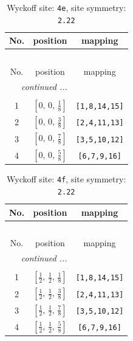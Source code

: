 \documentclass[fleqn,8pt]{jsarticle}
\begin{document}
\renewcommand{\arraystretch}{1.2}
\begin{longtable}{ccc}
\caption{Wyckoff site: {\tt 4e}, site symmetry: {\tt 2.22}}
 \\
 \hline \hline
No. & position & mapping \\ \hline \endfirsthead

\multicolumn{2}{l}{\tablename\ \thetable{}} \\
 \hline \hline
No. & position & mapping \\ \hline \endhead

 \hline \hline
\multicolumn{2}{r}{\footnotesize\it continued ...} \\ \endfoot

 \hline \hline
\multicolumn{2}{r}{} \\ \endlastfoot

1 & $\left[ 0,\, 0,\, \frac{1}{8} \right]$ & {\tt [1,8,14,15]} \\ \hline
2 & $\left[ 0,\, 0,\, \frac{3}{8} \right]$ & {\tt [2,4,11,13]} \\ \hline
3 & $\left[ 0,\, 0,\, \frac{7}{8} \right]$ & {\tt [3,5,10,12]} \\ \hline
4 & $\left[ 0,\, 0,\, \frac{5}{8} \right]$ & {\tt [6,7,9,16]} \\
\end{longtable}
\renewcommand{\arraystretch}{1.2}
\begin{longtable}{ccc}
\caption{Wyckoff site: {\tt 4f}, site symmetry: {\tt 2.22}}
 \\
 \hline \hline
No. & position & mapping \\ \hline \endfirsthead

\multicolumn{2}{l}{\tablename\ \thetable{}} \\
 \hline \hline
No. & position & mapping \\ \hline \endhead

 \hline \hline
\multicolumn{2}{r}{\footnotesize\it continued ...} \\ \endfoot

 \hline \hline
\multicolumn{2}{r}{} \\ \endlastfoot

1 & $\left[ \frac{1}{2},\, \frac{1}{2},\, \frac{1}{8} \right]$ & {\tt [1,8,14,15]} \\ \hline
2 & $\left[ \frac{1}{2},\, \frac{1}{2},\, \frac{3}{8} \right]$ & {\tt [2,4,11,13]} \\ \hline
3 & $\left[ \frac{1}{2},\, \frac{1}{2},\, \frac{7}{8} \right]$ & {\tt [3,5,10,12]} \\ \hline
4 & $\left[ \frac{1}{2},\, \frac{1}{2},\, \frac{5}{8} \right]$ & {\tt [6,7,9,16]} \\
\end{longtable}
\end{document}
